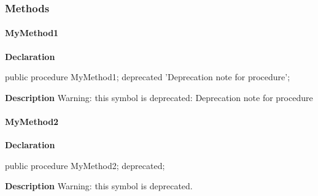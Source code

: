 \documentclass{report}
\begin{document}
\subsubsection*{\large{\textbf{Methods}}\normalsize\hspace{1ex}\hfill}
\paragraph*{MyMethod1}\hspace*{\fill}

\begin{list}{}{
\setlength{\itemindent}{0cm}
\setlength{\listparindent}{0cm}
\setlength{\leftmargin}{\evensidemargin}
\addtolength{\leftmargin}{\tmplength}
\settowidth{\labelsep}{X}
\addtolength{\leftmargin}{\labelsep}
\setlength{\labelwidth}{\tmplength}
}
\begin{flushleft}
\item[\textbf{Declaration}\hfill]
\begin{ttfamily}
public procedure MyMethod1; deprecated 'Deprecation note for procedure';\end{ttfamily}


\end{flushleft}
\par
\item[\textbf{Description}]
Warning: this symbol is deprecated: Deprecation note for procedure

 

\end{list}
\paragraph*{MyMethod2}\hspace*{\fill}

\begin{list}{}{
\setlength{\itemindent}{0cm}
\setlength{\listparindent}{0cm}
\setlength{\leftmargin}{\evensidemargin}
\addtolength{\leftmargin}{\tmplength}
\settowidth{\labelsep}{X}
\addtolength{\leftmargin}{\labelsep}
\setlength{\labelwidth}{\tmplength}
}
\begin{flushleft}
\item[\textbf{Declaration}\hfill]
\begin{ttfamily}
public procedure MyMethod2; deprecated;\end{ttfamily}


\end{flushleft}
\par
\item[\textbf{Description}]
Warning: this symbol is deprecated.

 

\end{list}
\end{document}
